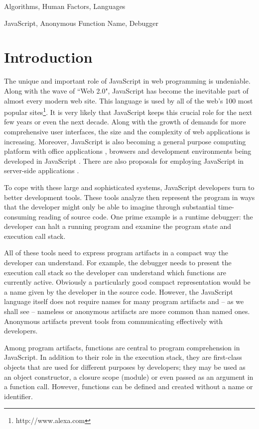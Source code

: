 \documentclass[10pt, preprint]{sigplanconf}
\begin{document}
\terms
Algorithms, Human Factors, Languages

\keywords
JavaScript, Anonymous Function Name, Debugger

\section{Introduction}
The unique and important role of JavaScript in web programming is undeniable. Along with the wave of ``Web 2.0", JavaScript has become the inevitable part of almost every modern web site. This language is used by all of the web's 100 most popular sites\footnote[1]{http://www.alexa.com}\cite{Richards1}. It is very likely that JavaScript keeps this crucial role for the next few years or even the next decade. Along with the growth of demands for more comprehensive user interfaces, the size and the complexity of web applications is increasing. Moreover, JavaScript is also becoming a general purpose computing platform with office applications \cite{JSOffice, JSOffice2}, browsers \cite{FAO, GCE} and development environments \cite{Ingalls} being developed in JavaScript \cite{Richards2}. There are also proposals for employing JavaScript in server-side applications \cite{SSJSR, CJS}.

To cope with these large and sophisticated systems, JavaScript developers turn to better development tools. These tools analyze then represent the program in ways that the developer might only be able to imagine through substantial time-consuming reading of source code.  One prime example is a runtime debugger: the developer can halt a running program and examine the program state and execution call stack. 

All of these tools need to express program artifacts in a compact way the developer can understand.  For example, the debugger needs to present the execution call stack so the developer can understand which functions are currently active.  Obviously a particularly good compact representation would be a name given by the developer in the source code. However, the JavaScript language itself does not require names for many program artifacts and -- as we shall see -- nameless or anonymous artifacts are more common than named ones. Anonymous artifacts prevent tools from communicating effectively with developers.

Among program artifacts, functions are central to program comprehension in JavaScript. In addition to their role in the execution stack, they are first-class objects that are used for different purposes by developers; they may be used as an object constructor, a closure scope (module) or even  passed as an argument in a function call. However, functions can be defined and created without a name or identifier.  
\end{document}
